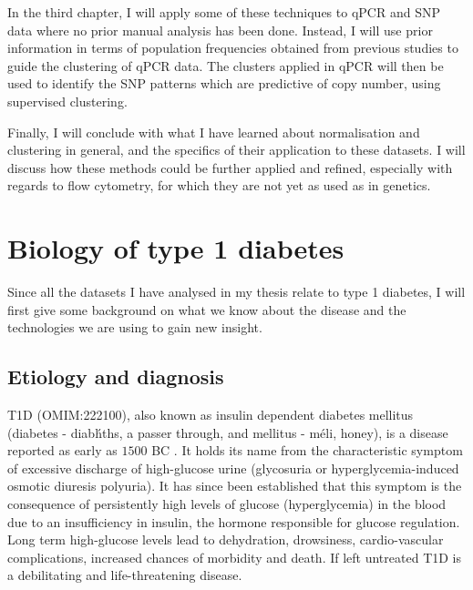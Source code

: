 In the third chapter, I will apply some of these techniques to \gls{qPCR} and \gls{SNP} data where no prior manual analysis has been done.
Instead, I will use prior information in terms of population frequencies obtained from previous studies to guide the clustering of qPCR data.
The clusters applied in qPCR will then be used to identify the SNP patterns which are predictive of copy number, using supervised clustering.

Finally, I will conclude with what I have learned about normalisation and clustering in general, and the specifics of their application to these datasets.
I will discuss how these methods could be further applied and refined, especially with regards to flow cytometry, for which they are
not yet as used as in genetics.


\section{Biology of type 1 diabetes}

Since all the datasets I have analysed in my thesis relate to type 1 diabetes, I will first give some background on
what we know about the disease and the technologies we are using to gain new insight.

\subsection{Etiology and diagnosis}

\Gls{T1D} (OMIM:222100), also known as insulin dependent diabetes mellitus (diabetes - \foreignlanguage{greek}{diab\'hths},
a passer through, and mellitus - \foreignlanguage{greek}{m\'eli}, honey), is a disease reported as early as $1500$ BC \citep{Poretsky:2010wr}.
It holds its name from the characteristic symptom of excessive discharge of high-glucose urine (glycosuria or hyperglycemia-induced osmotic diuresis polyuria).
It has since been established that this symptom is the consequence of persistently high levels of glucose (hyperglycemia) in the blood due to an insufficiency in insulin,
the hormone responsible for glucose regulation.
Long term high-glucose levels lead to dehydration, drowsiness, cardio-vascular complications, increased chances of morbidity and death.  
If left untreated T1D is a debilitating and life-threatening disease.


